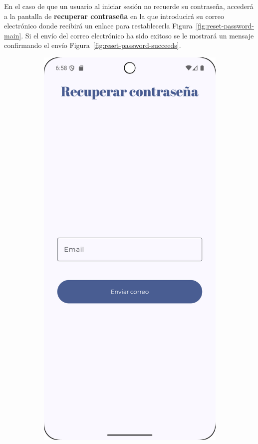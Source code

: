 \clearpage
En el caso de que un usuario al iniciar sesión no recuerde su contraseña, accederá a la pantalla de \textbf{recuperar contraseña} en la que introducirá su correo electrónico donde recibirá un enlace para restablecerla Figura~\ref{fig:reset-password-main}. Si el envío del correo electrónico ha sido exitoso se le mostrará un mensaje confirmando el envío Figura~\ref{fig:reset-password-succeeds}.

\begin{figure}[H]
    \centering

    \begin{subfigure}[b]{0.3\textwidth}
      \includegraphics[width=\textwidth]{./img/manual/sent_reset_password_email.png}

\end{subfigure}
\end{figure}

